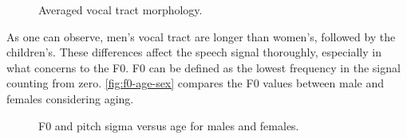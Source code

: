 \begin{figure}[!ht]
        \noindent{}
        \caption{Averaged vocal tract morphology.}
        \label{fig:vocal-tract-morphology}
\end{figure}

As one can observe, men's vocal tract are longer than women's, followed by the children's. These differences 
affect the speech signal thoroughly, especially in what concerns to the \ac{F0}. \ac{F0} can be defined as the 
lowest frequency in the signal counting from zero. \autoref{fig:f0-age-sex} compares the \ac{F0} values
between male and females considering aging.

\begin{figure}[!ht]
        \noindent{}
        \caption{F0 and pitch sigma versus age for males and females.}
        \label{fig:f0-age-sex}
\end{figure}

